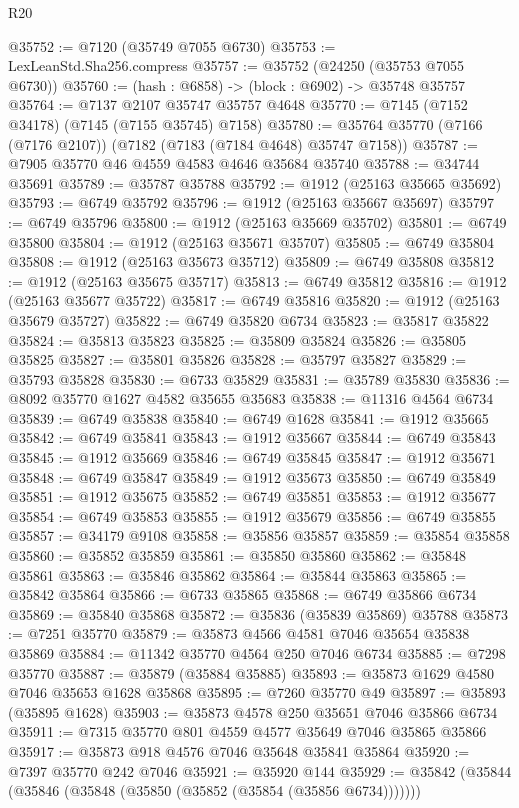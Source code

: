 \begin{lexlean}{R20}
\begin{coremodule}
{@35752 := @7120 (@35749 @7055 @6730)
@35753 := LexLeanStd.Sha256.compress
@35757 := @35752 (@24250 (@35753 @7055 @6730))
@35760 := (hash : @6858) -> (block : @6902) -> @35748 @35757
@35764 := @7137 @2107 @35747 @35757 @4648
@35770 := @7145 (@7152 @34178) (@7145 (@7155 @35745) @7158)
@35780 := @35764 @35770 (@7166 (@7176 @2107)) (@7182 (@7183 (@7184 @4648) @35747 @7158))
@35787 := @7905 @35770 @46 @4559 @4583 @4646 @35684 @35740
@35788 := @34744 @35691
@35789 := @35787 @35788
@35792 := @1912 (@25163 @35665 @35692)
@35793 := @6749 @35792
@35796 := @1912 (@25163 @35667 @35697)
@35797 := @6749 @35796
@35800 := @1912 (@25163 @35669 @35702)
@35801 := @6749 @35800
@35804 := @1912 (@25163 @35671 @35707)
@35805 := @6749 @35804
@35808 := @1912 (@25163 @35673 @35712)
@35809 := @6749 @35808
@35812 := @1912 (@25163 @35675 @35717)
@35813 := @6749 @35812
@35816 := @1912 (@25163 @35677 @35722)
@35817 := @6749 @35816
@35820 := @1912 (@25163 @35679 @35727)
@35822 := @6749 @35820 @6734
@35823 := @35817 @35822
@35824 := @35813 @35823
@35825 := @35809 @35824
@35826 := @35805 @35825
@35827 := @35801 @35826
@35828 := @35797 @35827
@35829 := @35793 @35828
@35830 := @6733 @35829
@35831 := @35789 @35830
@35836 := @8092 @35770 @1627 @4582 @35655 @35683
@35838 := @11316 @4564 @6734
@35839 := @6749 @35838
@35840 := @6749 @1628
@35841 := @1912 @35665
@35842 := @6749 @35841
@35843 := @1912 @35667
@35844 := @6749 @35843
@35845 := @1912 @35669
@35846 := @6749 @35845
@35847 := @1912 @35671
@35848 := @6749 @35847
@35849 := @1912 @35673
@35850 := @6749 @35849
@35851 := @1912 @35675
@35852 := @6749 @35851
@35853 := @1912 @35677
@35854 := @6749 @35853
@35855 := @1912 @35679
@35856 := @6749 @35855
@35857 := @34179 @9108
@35858 := @35856 @35857
@35859 := @35854 @35858
@35860 := @35852 @35859
@35861 := @35850 @35860
@35862 := @35848 @35861
@35863 := @35846 @35862
@35864 := @35844 @35863
@35865 := @35842 @35864
@35866 := @6733 @35865
@35868 := @6749 @35866 @6734
@35869 := @35840 @35868
@35872 := @35836 (@35839 @35869) @35788
@35873 := @7251 @35770
@35879 := @35873 @4566 @4581 @7046 @35654 @35838 @35869
@35884 := @11342 @35770 @4564 @250 @7046 @6734
@35885 := @7298 @35770
@35887 := @35879 (@35884 @35885)
@35893 := @35873 @1629 @4580 @7046 @35653 @1628 @35868
@35895 := @7260 @35770 @49
@35897 := @35893 (@35895 @1628)
@35903 := @35873 @4578 @250 @35651 @7046 @35866 @6734
@35911 := @7315 @35770 @801 @4559 @4577 @35649 @7046 @35865 @35866
@35917 := @35873 @918 @4576 @7046 @35648 @35841 @35864
@35920 := @7397 @35770 @242 @7046
@35921 := @35920 @144
@35929 := @35842 (@35844 (@35846 (@35848 (@35850 (@35852 (@35854 (@35856 @6734)))))))
}
\end{coremodule}
\end{lexlean}
